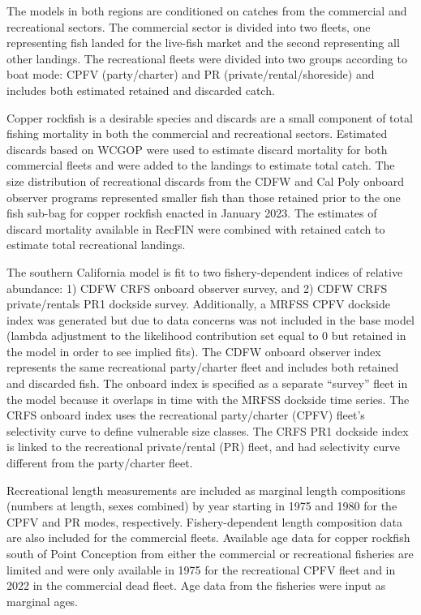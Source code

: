 \documentclass[11pt,
  english,
  letterpaper,
]{article}
\begin{document}
The models in both regions are conditioned on catches from the commercial and recreational sectors. The commercial sector is divided into two fleets, one representing fish landed for the live-fish market and the second representing all other landings. The recreational fleets were divided into two groups according to boat mode: CPFV (party/charter) and PR (private/rental/shoreside) and includes both estimated retained and discarded catch.

Copper rockfish is a desirable species and discards are a small component of total fishing mortality in both the commercial and recreational sectors. Estimated discards based on WCGOP were used to estimate discard mortality for both commercial fleets and were added to the landings to estimate total catch. The size distribution of recreational discards from the CDFW and Cal Poly onboard observer programs represented smaller fish than those retained prior to the one fish sub-bag for copper rockfish enacted in January 2023. The estimates of discard mortality available in RecFIN were combined with retained catch to estimate total recreational landings.

The southern California model is fit to two fishery-dependent indices of relative abundance: 1) CDFW CRFS onboard observer survey, and 2) CDFW CRFS private/rentals PR1 dockside survey. Additionally, a MRFSS CPFV dockside index was generated but due to data concerns was not included in the base model (lambda adjustment to the likelihood contribution set equal to 0 but retained in the model in order to see implied fits). The CDFW onboard observer index represents the same recreational party/charter fleet and includes both retained and discarded fish. The onboard index is specified as a separate ``survey'' fleet in the model because it overlaps in time with the MRFSS dockside time series. The CRFS onboard index uses the recreational party/charter (CPFV) fleet's selectivity curve to define vulnerable size classes. The CRFS PR1 dockside index is linked to the recreational private/rental (PR) fleet, and had selectivity curve different from the party/charter fleet.

Recreational length measurements are included as marginal length compositions (numbers at length, sexes combined) by year starting in 1975 and 1980 for the CPFV and PR modes, respectively. Fishery-dependent length composition data are also included for the commercial fleets. Available age data for copper rockfish south of Point Conception from either the commercial or recreational fisheries are limited and were only available in 1975 for the recreational CPFV fleet and in 2022 in the commercial dead fleet. Age data from the fisheries were input as marginal ages.
\end{document}
